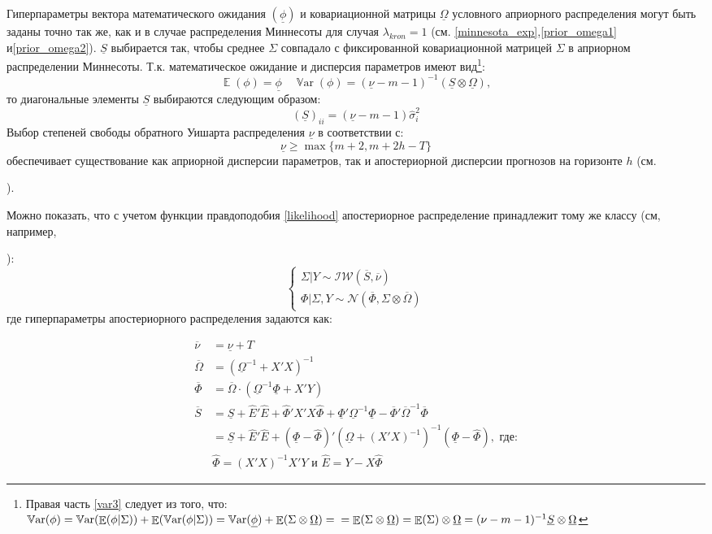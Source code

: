 \documentclass[11pt]{article} %
\DeclareMathOperator{\E}{\mathbb{E}}
\DeclareMathOperator{\Var}{\mathbb{V}\mathrm{ar}}
\newcommand{\cN}{\mathcal{N}}
\newcommand{\cIW}{\mathcal{IW}}
\newcommand{\prior}{\underline}
\newcommand{\post}{\overline}
\newcommand{\eng}[1]{\begin{otherlanguage}{english}#1\end{otherlanguage}}
\begin{document}
Гиперпараметры вектора математического ожидания $(\prior \phi)$ и ковариационной матрицы $\prior \Omega$ условного априорного распределения  могут быть заданы точно так же, как и в случае распределения Миннесоты для  случая $\lambda_{kron} =1$ (см. \eqref{minnesota_exp},\eqref{prior_omega1} и\eqref{prior_omega2}).
$\prior S$ выбирается так, чтобы среднее $\Sigma$ совпадало с фиксированной ковариационной матрицей $\Sigma$ в априорном распределении Миннесоты. Т.к. математическое ожидание и дисперсия параметров имеют вид\footnote{Правая часть \ref{var3} следует из того, что:
$\Var(\phi)=\Var(\E(\phi|\Sigma))+\E(\Var(\phi|\Sigma))=\Var(\prior\phi)+\E(\Sigma\otimes\prior\Omega)=\\=\E(\Sigma\otimes\prior\Omega)=\E(\Sigma)\otimes\prior\Omega=(\nu-m-1)^{-1}\prior S\otimes \prior\Omega$
}:
\begin{equation}
\E(\phi)=\prior \phi \quad \Var(\phi)=(\prior \nu - m -1)^{-1}(\prior S\otimes \prior \Omega),\label{var3}
\end{equation}
то диагональные элементы $\prior S$ выбираются следующим образом:
\begin{equation}
(\prior S)_{ii}= (\prior \nu- m- 1) \hat\sigma^2_{i}
\end{equation}
Выбор степеней свободы обратного Уишарта распределения $\prior\nu$ в соответствии с:
\begin{equation}
\prior \nu \geq\max\lbrace m+2, m+2h-T\rbrace
\end{equation}
обеспечивает существование как априорной дисперсии параметров, так и апостериорной дисперсии прогнозов на горизонте $h$ (см. \eng{\cite{kadiyala_karlsson_1997}}).

Можно показать, что с учетом функции правдоподобия \eqref{likelihood} апостериорное распределение принадлежит тому же классу (см, например, \eng{\cite{zellner_1996}}):
\begin{equation}
\begin{cases}
\Sigma|Y \sim \cIW(\post S, \post \nu) \\
\Phi|\Sigma,Y\sim \cN (\post \Phi, \Sigma\otimes\post \Omega)
\end{cases}
\end{equation}
где гиперпараметры апостериорного распределения задаются как:

\begin{align*}
\post\nu &=\prior \nu+T\\
\post{\Omega}&=(\prior \Omega^{-1}+X'X)^{-1}\\
\post \Phi&=\post{\Omega}\cdot (\prior \Omega^{-1}\prior \Phi+X'Y)\\
\post S&=\prior S +\hat E'\hat E+\hat \Phi'
 X'X \hat \Phi +\prior \Phi'\prior\Omega^{-1}\prior \Phi-\post \Phi'\post\Omega^{-1}\post \Phi\\&=\prior S +\hat E'\hat E + (\prior \Phi - \hat \Phi)'(\prior \Omega + (X'X)^{-1})^{-1}(\prior \Phi - \hat \Phi), \text{ где:} \\
&\hat\Phi=(X'X)^{-1}X'Y \text{ и } \hat E=Y-X\hat\Phi
\end{align*}
\end{document}

